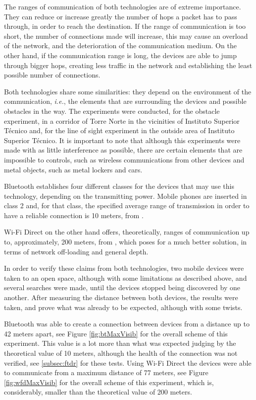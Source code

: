 The ranges of communication of both technologies are of extreme importance. They can reduce or increase greatly the number of hops a packet has to pass through, in order to reach the destination. If the range of communication is too short, the number of connections made will increase, this may cause an overload of the network, and the deterioration of the communication medium. On the other hand, if the communication range is long, the devices are able to jump through bigger hops, creating less traffic in the network and establishing the least possible number of connections.

Both technologies share some similarities: they depend on the environment of the communication, \textit{i.e.}, the elements that are surrounding the devices and possible obstacles in the way. The experiments were conducted, for the obstacle experiment, in a corridor of Torre Norte in the vicinities of Instituto Superior Técnico and, for the line of sight experiment in the outside area of Instituto Superior Técnico. It is important to note that although this experiments were made with as little interference as possible, there are certain elements that are impossible to controls, such as wireless communications from other devices and metal objects, such as metal lockers and cars.

Bluetooth establishes four different classes for the devices that may use this technology, depending on the transmitting power. Mobile phones are inserted in class 2 and, for that class, the specified average range of transmission in order to have a reliable connection is 10 meters, from \cite{bluetooth}.

Wi-Fi Direct on the other hand offers, theoretically, ranges of communication up to, approximately, 200 meters, from \cite{wfdrange}, which poses for a much better solution, in terms of network off-loading and general depth.

In order to verify these claims from both technologies, two mobile devices were taken to an open space, although with some limitations as described above, and several searches were made, until the devices stopped being discovered by one another. After measuring the distance between both devices, the results were taken, and prove what was already to be expected, although with some twists. 

Bluetooth was able to create a connection between devices from a distance up to 42 meters apart, see Figure \ref{fig:btMaxVisib} for the overall scheme of this experiment. This value is a lot more than what was expected judging by the theoretical value of 10 meters, although the health of the connection was not verified, see \ref{subsec:ftdr} for these tests. Using Wi-Fi Direct the devices were able to communicate from a maximum distance of 77 meters, see Figure \ref{fig:wfdMaxVisib} for the overall scheme of this experiment, which is, considerably, smaller than the theoretical value of 200 meters.

